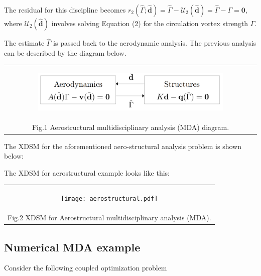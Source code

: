 \documentclass[11pt]{article}
\begin{document}
The residual for this discipline becomes
\(r_2(\hat{\Gamma};\hat{\mathbf{d}}) = \hat{\Gamma} - \mathcal{U}_2(\hat{\mathbf{d}}) = \hat{\Gamma} - {\Gamma} = \mathbf{0}\),
where \(\mathcal{U}_2(\hat{\mathbf{d}})\) involves solving Equation (2)
for the circulation vortex strength \(\Gamma\).

The estimate \(\hat{\Gamma}\) is passed back to the aerodynamic
analysis. The previous analysis can be described by the diagram below.

\begin{longtable}[]{@{}c@{}}
\toprule
\endhead
\begin{minipage}[t]{0.97\columnwidth}\centering
    \begin{figure}
        \centering
        \includegraphics[width=0.9\textwidth]{images/MDA_diagram_aero.png}
    \end{figure}\strut
\end{minipage}\tabularnewline
Fig.1 Aerostructural multidisciplinary analysis (MDA)
diagram.\tabularnewline
\bottomrule
\end{longtable}

The XDSM for the aforementioned aero-structural analysis problem is
shown below:

The XDSM for aerostructural example looks like this:

\begin{longtable}[]{@{}c@{}}
\toprule
\endhead
\begin{minipage}[t]{0.97\columnwidth}\centering
    \begin{figure}
        \centering
        \texttt{[image: aerostructural.pdf]}
    \end{figure}\strut
\end{minipage}\tabularnewline
Fig.2 XDSM for Aerostructural multidisciplinary analysis
(MDA).\tabularnewline
\bottomrule
\end{longtable}

    \hypertarget{numerical-mda-example}{%
\subsection{Numerical MDA example}\label{numerical-mda-example}}

Consider the following coupled optimization problem
\end{document}
